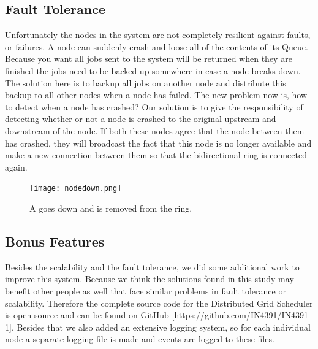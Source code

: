 \documentclass[twocolumn,a4paper]{article}
\begin{document}
\subsection{Fault Tolerance}
Unfortunately the nodes in the system are not completely resilient against faults, or failures. A node can suddenly crash and loose all of the contents of its Queue. Because you want all jobs sent to the system will be returned when they are finished the jobs need to be backed up somewhere in case a node breaks down. The solution here is to backup all jobs on another node and distribute this backup to all other nodes when a node has failed. The new problem now is, how to detect when a node has crashed? Our solution is to give the responsibility of detecting whether or not a node is crashed to the original upstream and downstream of the node. If both these nodes agree that the node between them has crashed, they will broadcast the fact that this node is no longer available and make a new connection between them so that the bidirectional ring is connected again.
\begin{figure}
  \texttt{[image: nodedown.png]}
  \caption{A goes down and is removed from the ring.}
\end{figure}

\subsection{Bonus Features}
Besides the scalability and the fault tolerance, we did some additional work to improve this system. Because we think the solutions found in this study may benefit other people as well that face similar problems in fault tolerance or scalability. Therefore the complete source code for the Distributed Grid Scheduler is open source and can be found on GitHub [https://github.com/IN4391/IN4391-1]. Besides that we also added an extensive logging system, so for each individual node a separate logging file is made and events are logged to these files.
\end{document}
